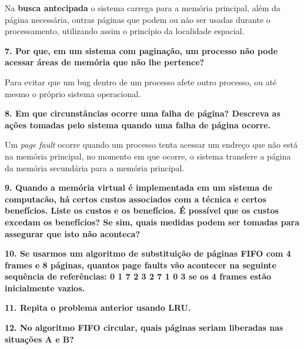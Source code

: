 \documentclass[12pt,a4paper]{article}
\newcommand{\pergunta}[1]{\noindent \textbf{#1}}
\begin{document}
Na \textbf{busca antecipada} o sistema carrega para a memória principal, além
da página necessária, outras páginas que podem ou não ser usadas durante o 
processamento, utilizando assim o princípio da localidade espacial.

\pergunta {7. Por que, em um sistema com paginação, um processo não pode acessar
 áreas de memória que não lhe pertence?}

Para evitar que um bug dentro de um processo afete outro processo, ou até mesmo
o próprio sistema operacional.

\pergunta{8. Em que circunstâncias ocorre uma falha de página? Descreva as ações
tomadas pelo sistema quando uma falha de página ocorre.}

Um \textsl{page fault} ocorre quando um processo tenta acessar um endreço que 
não está na memória principal, no momento em que ocorre, o sistema transfere a 
página da memória secundária para a memória principal.

\pergunta{9. Quando a memória virtual é implementada em um sistema de 
computacão, há
certos custos associados com a técnica e certos benefícios. Liste os custos e os
benefícios. É possível que os custos excedam os benefícios? Se sim, quais
medidas podem ser tomadas para assegurar que isto não aconteca?}


\pergunta{10. Se usarmos um algoritmo de substituição de páginas FIFO com 4 
frames e 8 páginas, quantos page faults vão acontecer na seguinte sequência de 
referências: 0 1 7 2 3 2 7 1 0 3 se os 4 frames estão inicialmente vazios.}

\pergunta{11. Repita o problema anterior usando LRU.}

\pergunta{12. No algoritmo FIFO circular, quais páginas seriam liberadas nas 
situações A e B?}
\end{document}
